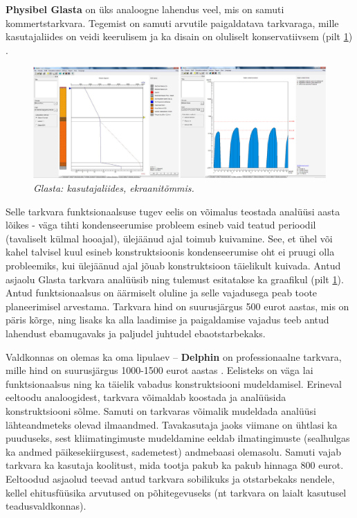 \textbf{Physibel Glasta} on üks analoogne lahendus veel, mis on samuti kommertstarkvara. Tegemist on samuti arvutile paigaldatava tarkvaraga, mille
kasutajaliides on veidi keerulisem ja ka disain on oluliselt konservatiivsem (pilt \ref{fig:glasta_sample}) \cite{glasta}. 
\begin{figure}[ht]
    \centering
    \includegraphics[width=1\textwidth]{figures/problem_statement/09_glasta_sample.png}
    \caption[Physibel Glasta tarkvara kasutajaliides, ekraanitõmmis]{\textit{Glasta: kasutajaliides, ekraanitõmmis.}}
    \label{fig:glasta_sample}
\end{figure}

Selle tarkvara funktsionaalsuse tugev eelis on võimalus teostada analüüsi aasta lõikes - väga tihti 
kondenseerumise probleem esineb vaid teatud perioodil (tavaliselt külmal hooajal),
ülejäänud ajal toimub kuivamine. See, et ühel või kahel talvisel kuul esineb konstruktsioonis kondenseerumise oht ei pruugi
olla probleemiks, kui ülejäänud ajal jõuab konstruktsioon täielikult kuivada. Antud asjaolu Glasta tarkvara analüüsib ning 
tulemust esitatakse ka graafikul (pilt \ref{fig:glasta_sample}). Antud funktsionaalsus on äärmiselt oluline ja selle vajadusega peab toote 
planeerimisel arvestama. Tarkvara hind on suurusjärgus 500 eurot aastas, mis on päris kõrge, ning lisaks ka alla laadimise ja 
paigaldamise vajadus teeb antud lahendust ebamugavaks ja paljudel juhtudel ebaotstarbekaks.

Valdkonnas on olemas ka oma lipulaev -- \textbf{Delphin} on professionaalne tarkvara, mille hind on suurusjärgus 1000-1500 eurot aastas \cite{delphin}.
Eelisteks on väga lai funktsionaalsus ning ka täielik vabadus konstruktsiooni mudeldamisel. Erineval eeltoodu analoogidest,
tarkvara võimaldab koostada ja analüüsida konstruktsiooni sõlme. Samuti on tarkvaras võimalik mudeldada analüüsi lähteandmeteks olevad
ilmaandmed. Tavakasutaja jaoks viimane on ühtlasi ka puuduseks, sest kliimatingimuste mudeldamine eeldab ilmatingimuste 
(sealhulgas ka andmed päikesekiirgusest, sademetest) andmebaasi olemasolu. Samuti vajab tarkvara ka kasutaja koolitust, 
mida tootja pakub ka pakub hinnaga 800 eurot. Eeltoodud asjaolud teevad antud tarkvara sobilikuks ja otstarbekaks
nendele, kellel ehitusfüüsika arvutused on põhitegevuseks (nt tarkvara on laialt kasutusel teadusvaldkonnas). 

